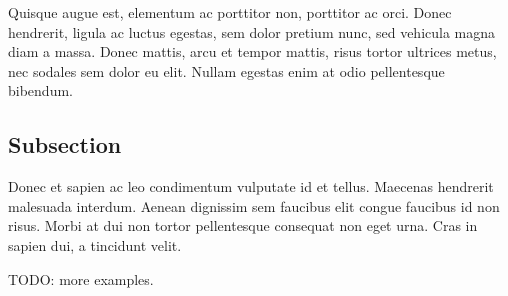 \documentclass[11pt,a4paper,oneside]{memoir}
\begin{document}
Quisque augue est, elementum ac porttitor non, porttitor ac orci. Donec hendrerit, ligula ac luctus egestas, sem dolor pretium nunc, sed vehicula magna diam a massa. Donec mattis, arcu et tempor mattis, risus tortor ultrices metus, nec sodales sem dolor eu elit. Nullam egestas enim at odio pellentesque bibendum. 

\subsection{Subsection}
Donec et sapien ac leo condimentum vulputate id et tellus. Maecenas hendrerit malesuada interdum. Aenean dignissim sem faucibus elit congue faucibus id non risus. Morbi at dui non tortor pellentesque consequat non eget urna. Cras in sapien dui, a tincidunt velit.

TODO: more examples.



\singlespacing
\begin{flushleft}

\end{flushleft}
\end{document}
